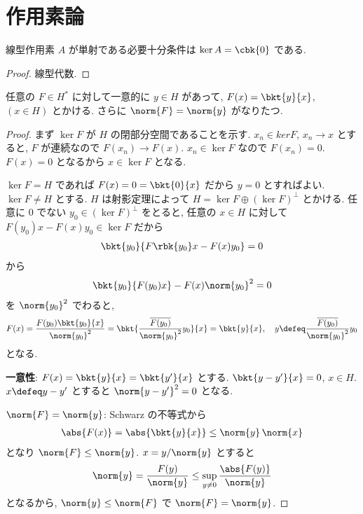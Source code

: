 \documentclass[openany, a4paper, oneside]{jsbook}
\begin{document}
\section{作用素論}

\begin{prop}
 線型作用素 $A$ が単射である必要十分条件は $\ker A = \cbk{0}$ である.
\end{prop}
\begin{proof}
線型代数.
\end{proof}

\begin{thm}\label{functional_analysis_hilbert_space_yukimi_11}
 任意の $F \in H^*$ に対して一意的に $y \in H$ があって, $F(x) = \bkt{y}{x}$, $(x \in H)$ とかける.
 さらに $\norm{F} = \norm{y}$ がなりたつ.
\end{thm}
\begin{proof}
まず $\ker F$ が $H$ の閉部分空間であることを示す.
$x_n \in ker F$, $x_{n} \to x$ とすると,
$F$ が連続なので $F (x_n) \to F (x)$.
$x_n \in \ker F$ なので $F (x_n) = 0$.
$F(x) = 0$ となるから $x \in \ker F$ となる.

$\ker F = H$ であれば $F(x) = 0 = \bkt{0}{x}$ だから $y = 0$ とすればよい.
$\ker F \neq H$ とする.
$H$ は射影定理によって $H = \ker F \oplus (\ker F)^\perp$ とかける.
任意に $0$ でない $y_0 \in (\ker F)^\perp$ をとると, 任意の $x \in H$ に対して
$F(y_0) x - F (x) y_0 \in \ker F$ だから
\begin{align}
 \bkt{y_0}{F \rbk{y_0} x - F(x) y_0}
 =
 0
\end{align}
から
\begin{align}
 \bkt{y_0}{F(y_0) x} - F(x) \norm{y_0}^2
 =
 0
\end{align}
を $\norm{y_0}^2$ でわると,
\begin{align}
 F(x)
 =
 \frac{F(y_0) \bkt{y_0}{x}}{\norm{y_0}^2}
 =
 \bkt{\frac{\overline{F(y_0)}}{\norm{y_0}^2} y_0}{x}
 =
 \bkt{y}{x}, \quad
 y
 \defeq
 \frac{\overline{F(y_0)}}{\norm{y_0}^2} y_0
\end{align}
となる.

\textbf{一意性}:
$F (x) = \bkt{y}{x} = \bkt{y'}{x}$ とする.
$\bkt{y - y'}{x} = 0$, $x \in H$.
$x \defeq y - y'$ とすると $\norm{y - y'}^2 = 0$ となる.

$\norm{F} = \norm{y}$:
Schwarz の不等式から
\begin{align}
 \abs{F(x)}
 =
 \abs{\bkt{y}{x}}
 \leq
 \norm{y} \, \norm{x}
\end{align}
となり $\norm{F} \leq \norm{y}$.
$x = y / \norm{y}$ とすると
\begin{align}
 \norm{y} = \frac{F(y)}{\norm{y}}
 \leq
 \sup_{y \neq 0} \frac{\abs{F(y)}}{\norm{y}}
\end{align}
となるから,  $\norm{y} \leq \norm{F}$ で $\norm{F} = \norm{y}$.
\end{proof}
\end{document}
